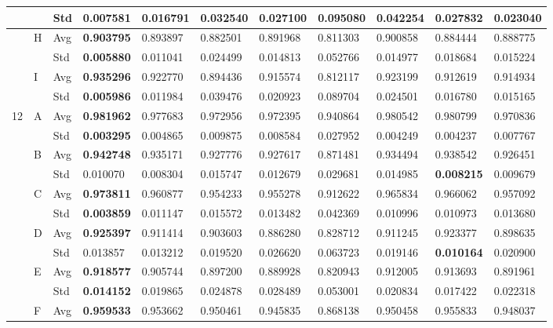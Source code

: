 \documentclass{article} %
\begin{document}
\begin{tabular}{|p{0.4in}|p{0.4in}|p{0.3in}|p{0.5in}|p{0.5in}|p{0.5in}|p{0.5in}|p{0.5in}|p{0.5in}|p{0.5in}|p{0.5in}|}
 &  & Std & \textbf{0.007581 } & 0.016791  & 0.032540  & 0.027100  & 0.095080  & 0.042254  & 0.027832  & 0.023040  \\ \hline 
 & H & Avg & \textbf{0.903795 } & 0.893897  & 0.882501  & 0.891968  & 0.811303  & 0.900858  & 0.884444  & 0.888775  \\ \hline 
 &  & Std & \textbf{0.005880 } & 0.011041  & 0.024499  & 0.014813  & 0.052766  & 0.014977  & 0.018684  & 0.015224  \\ \hline 
 & I & Avg & \textbf{0.935296 } & 0.922770  & 0.894436  & 0.915574  & 0.812117  & 0.923199  & 0.912619  & 0.914934  \\ \hline 
 &  & Std & \textbf{0.005986 } & 0.011984  & 0.039476  & 0.020923  & 0.089704  & 0.024501  & 0.016780  & 0.015165  \\ \hline 
12 & A & Avg & \textbf{0.981962 } & 0.977683  & 0.972956  & 0.972395  & 0.940864  & 0.980542  & 0.980799  & 0.970836  \\ \hline 
 &  & Std & \textbf{0.003295 } & 0.004865  & 0.009875  & 0.008584  & 0.027952  & 0.004249  & 0.004237  & 0.007767  \\ \hline 
 & B & Avg & \textbf{0.942748 } & 0.935171  & 0.927776  & 0.927617  & 0.871481  & 0.934494  & 0.938542  & 0.926451  \\ \hline 
 &  & Std & 0.010070  & 0.008304  & 0.015747  & 0.012679  & 0.029681  & 0.014985  & \textbf{0.008215 } & 0.009679  \\ \hline 
 & C & Avg & \textbf{0.973811 } & 0.960877  & 0.954233  & 0.955278  & 0.912622  & 0.965834  & 0.966062  & 0.957092  \\ \hline 
 &  & Std & \textbf{0.003859 } & 0.011147  & 0.015572  & 0.013482  & 0.042369  & 0.010996  & 0.010973  & 0.013680  \\ \hline 
 & D & Avg & \textbf{0.925397 } & 0.911414  & 0.903603  & 0.886280  & 0.828712  & 0.911245  & 0.923377  & 0.898635  \\ \hline 
 &  & Std & 0.013857  & 0.013212  & 0.019520  & 0.026620  & 0.063723  & 0.019146  & \textbf{0.010164 } & 0.020900  \\ \hline 
 & E & Avg & \textbf{0.918577 } & 0.905744  & 0.897200  & 0.889928  & 0.820943  & 0.912005  & 0.913693  & 0.891961  \\ \hline 
 &  & Std & \textbf{0.014152 } & 0.019865  & 0.024878  & 0.028489  & 0.053001  & 0.020834  & 0.017422  & 0.022318  \\ \hline 
 & F & Avg & \textbf{0.959533 } & 0.953662  & 0.950461  & 0.945835  & 0.868138  & 0.950458  & 0.955833  & 0.948037  \\ \hline 

\end{tabular}
\end{document}
